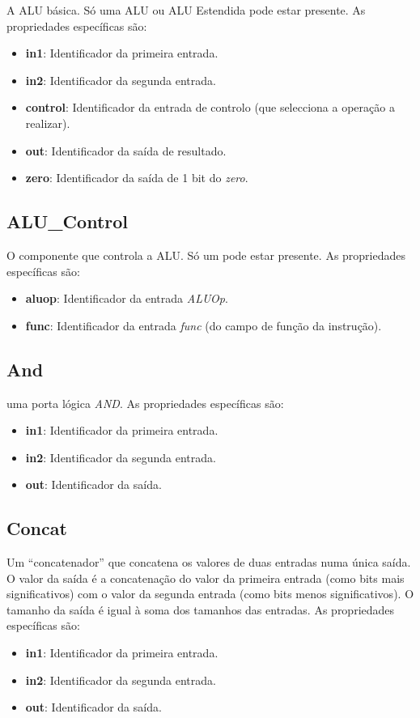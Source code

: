 \documentclass[11pt,a4paper,twoside,titlepage]{report}
\begin{document}
A ALU básica. Só uma ALU ou ALU Estendida pode estar presente. As propriedades
específicas são:
\begin{itemize}
	\item \textbf{in1}: Identificador da primeira entrada.
	\item \textbf{in2}: Identificador da segunda entrada.
	\item \textbf{control}: Identificador da entrada de controlo (que selecciona
		a operação a realizar).
	\item \textbf{out}: Identificador da saída de resultado.
	\item \textbf{zero}: Identificador da saída de 1 bit do \emph{zero}.
\end{itemize}

\subsection{ALU\_Control}

O componente que controla a ALU. Só um pode estar presente.
As propriedades específicas são:
\begin{itemize}
	\item \textbf{aluop}: Identificador da entrada \emph{ALUOp}.
	\item \textbf{func}: Identificador da entrada \emph{func} (do campo de função
		da instrução).
\end{itemize}

\subsection{And}

uma porta lógica \emph{AND}. As propriedades específicas são:
\begin{itemize}
	\item \textbf{in1}: Identificador da primeira entrada.
	\item \textbf{in2}: Identificador da segunda entrada.
	\item \textbf{out}: Identificador da saída.
\end{itemize}

\subsection{Concat}

Um ``concatenador'' que concatena os valores de duas entradas numa única saída.
O valor da saída é a concatenação do valor da primeira entrada (como bits mais
significativos) com o valor da segunda entrada (como bits menos significativos).
O tamanho da saída é igual à soma dos tamanhos das entradas.
As propriedades específicas são:
\begin{itemize}
	\item \textbf{in1}: Identificador da primeira entrada.
	\item \textbf{in2}: Identificador da segunda entrada.
	\item \textbf{out}: Identificador da saída.
\end{itemize}
\end{document}
